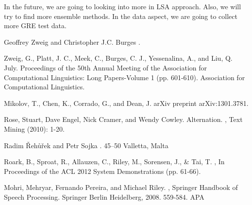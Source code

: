\documentclass[11pt]{article}
\begin{document}
In the future, we are going to looking into more in LSA approach. Also, we will try to find more ensemble methods. In the data aspect, we are going to collect more GRE test data.
\begin{thebibliography}{}

Geoffrey Zweig and Christopher J.C. Burges
.

Zweig, G., Platt, J. C., Meek, C., Burges, C. J., Yessenalina, A., and Liu, Q. 
 July.
\newblock Proceedings of the 50th Annual Meeting of the Association for Computational Linguistics: Long Papers-Volume 1 (pp. 601-610). Association for Computational Linguistics.

Mikolov, T., Chen, K., Corrado, G., and Dean, J.
\newblock arXiv preprint arXiv:1301.3781.

Rose, Stuart, Dave Engel, Nick Cramer, and Wendy Cowley.
\newblock Alternation.
,
\newblock Text Mining (2010): 1-20.

Radim {\v R}eh{\r u}{\v r}ek and Petr Sojka
. 45--50
\newblock Valletta, Malta

Roark, B., Sproat, R., Allauzen, C., Riley, M., Sorensen, J., \& Tai, T.
,
\newblock  In Proceedings of the ACL 2012 System Demonstrations (pp. 61-66).

Mohri, Mehryar, Fernando Pereira, and Michael Riley. 
,
\newblock Springer Handbook of Speech Processing. Springer Berlin Heidelberg, 2008. 559-584. APA

\end{thebibliography}
\end{document}
